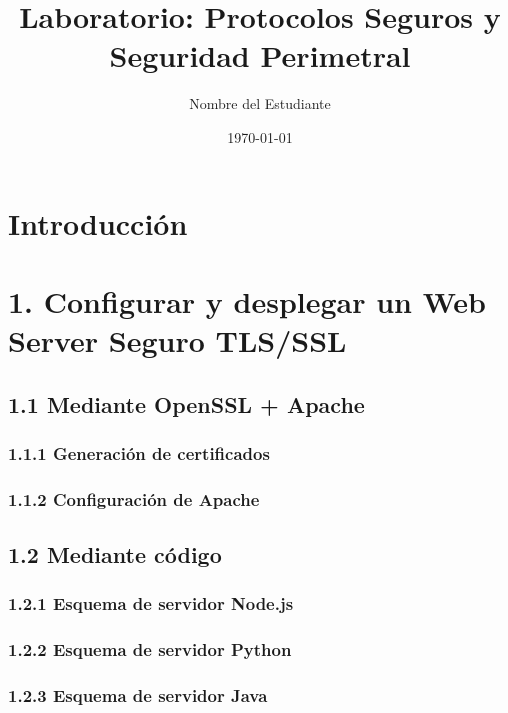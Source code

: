 \documentclass[12pt,a4paper]{article}
\begin{document}
\title{\LARGE \textbf{Laboratorio: Protocolos Seguros y Seguridad Perimetral}}
\author{Nombre del Estudiante}
\date{\today}

\maketitle

\section{Introducción}

\section{1. Configurar y desplegar un Web Server Seguro TLS/SSL}
\subsection{1.1 Mediante OpenSSL + Apache}
\subsubsection{1.1.1 Generación de certificados}

\subsubsection{1.1.2 Configuración de Apache}

\subsection{1.2 Mediante código}
\subsubsection{1.2.1 Esquema de servidor Node.js}

\subsubsection{1.2.2 Esquema de servidor Python}

\subsubsection{1.2.3 Esquema de servidor Java}
\end{document}
